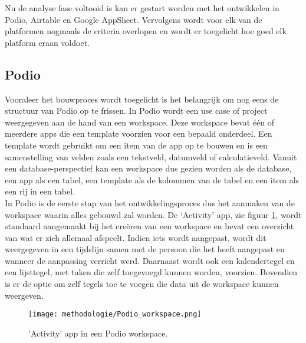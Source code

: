 Nu de analyse fase voltooid is kan er gestart worden met het ontwikkelen in Podio, Airtable en Google AppSheet. Vervolgens wordt voor elk van de platformen nogmaals de criteria overlopen en wordt er toegelicht hoe goed elk platform eraan voldoet. \\

\newpage



\subsection{Podio} %

Vooraleer het bouwproces wordt toegelicht is het belangrijk om nog eens de structuur van Podio op te frissen. In Podio wordt een use case of project weergegeven aan de hand van een workspace. Deze workspace bevat één of meerdere apps die een template voorzien voor een bepaald onderdeel. Een template wordt gebruikt om een item van de app op te bouwen en is een samenstelling van velden zoals een tekstveld, datumveld of calculatieveld. Vanuit een database-perspectief kan een workspace dus gezien worden als de database, een app als een tabel, een template als de kolommen van de tabel en een item als een rij in een tabel. \\

In Podio is de eerste stap van het ontwikkelingsproces dus het aanmaken van de workspace waarin alles gebouwd zal worden. De ‘Activity’ app, zie figuur \ref{fig:meth_podio_workspace}, wordt standaard aangemaakt bij het creëren van een workspace en bevat een overzicht van wat er zich allemaal afspeelt. Indien iets wordt aangepast, wordt dit weergegeven in een tijdslijn samen met de persoon die het heeft aangepast en wanneer de aanpassing verricht werd. Daarnaast wordt ook een kalendertegel en een lijsttegel, met taken die zelf toegevoegd kunnen worden, voorzien. Bovendien is er de optie om zelf tegels toe te voegen die data uit de workspace kunnen weergeven. \\

\begin{figure}[ht]
    \centering
    \texttt{[image: methodologie/Podio\_workspace.png]}
    \caption{'Activity' app in een Podio workspace.}
    \label{fig:meth_podio_workspace}
\end{figure}


